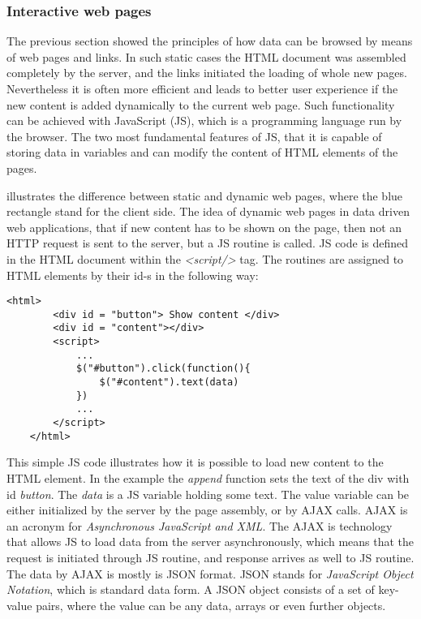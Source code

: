 \subsubsection{Interactive web pages}

The previous section showed the principles of how data can be browsed by means of web pages and links. In such static cases the HTML document was assembled completely by the server, and the links initiated the loading of whole new pages. Nevertheless it is often more efficient and leads to better user experience if the new content is added dynamically to the current web page. Such functionality can be achieved with JavaScript (JS), which is a programming language run by the browser. The two most fundamental features of JS, that it is capable of storing data in variables and can modify the content of HTML elements of the pages. 


 illustrates the difference between static and dynamic web pages, where the blue rectangle stand for the client side. The idea of dynamic web pages in data driven web applications, that if new content has to be shown on the page, then not an HTTP request is sent to the server, but a JS routine is called. JS code is defined in the HTML document within the \textit{<script/>} tag. The routines are assigned to HTML elements by their id-s in the following way:

\begin{lstlisting}[captionpos=b, caption=JavaScript routine assigned to an HTML element, label=jsListing, belowskip=1em, aboveskip=2em,
basicstyle=\footnotesize,frame=single]
	<html>
		<div id = "button"> Show content </div>
		<div id = "content"></div>
		<script>
			...
			$("#button").click(function(){
				$("#content").text(data)
			})
			...	
		</script>
	</html>
\end{lstlisting}


This simple JS code illustrates how it is possible to load new content to the HTML element. In the example the \textit{append} function sets the text of the div with id \textit{button}. The \textit{data} is a JS variable holding
some text. The value variable can be either initialized by the server by the page assembly, or by AJAX calls. AJAX is an acronym for \textit{Asynchronous JavaScript and XML}. The AJAX is technology that allows JS to load data from the server asynchronously, which means that the request is initiated through JS routine, and response arrives as well to JS routine. The data by AJAX is mostly is JSON format. JSON stands for \textit{JavaScript Object Notation}, which is standard data form. A JSON object consists of a set of key-value pairs, where the value can be any data, arrays or even further objects.

